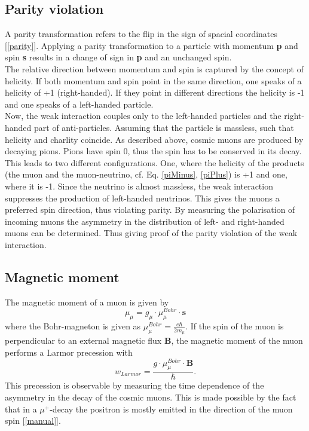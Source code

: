\subsection{Parity violation}
A parity transformation refers to the flip in the sign of spacial coordinates [\ref{parity}]. Applying a parity transformation to a particle with momentum \textbf{p} and spin \textbf{s} results in a change of sign in \textbf{p} and an unchanged spin.\\
The relative direction between momentum and spin is captured by the concept of helicity. If both momentum and spin point in the same direction, one speaks of a helicity of +1 (right-handed). If they point in different directions the helicity is -1 and one speaks of a left-handed particle.\\
Now, the weak interaction couples only to the left-handed particles and the right-handed part of anti-particles. Assuming that the particle is massless, such that helicity and charlity coincide. As described above, cosmic muons are produced by decaying pions. Pions have spin 0, thus the spin has to be conserved in its decay. This leads to two different configurations. One, where the helicity of the products (the muon and the muon-neutrino, cf. Eq. \ref{piMinus}, \ref{piPlus}) is +1 and one, where it is -1. Since the neutrino is almost massless, the weak interaction suppresses the production of left-handed neutrinos. This gives the muons a preferred spin direction, thus violating parity. By measuring the polarisation of incoming muons the asymmetry in the distribution of left- and right-handed muons can be determined. Thus giving proof of the parity violation of the weak interaction.\\

\subsection{Magnetic moment}
The magnetic moment of a muon is given by
\begin{equation}
\mu_{\mu} = g_\mu \cdot \mu_\mu^{Bohr} \cdot \mathbf{s}
\end{equation}
where the Bohr-magneton is given as $\mu_\mu^{Bohr} = \frac{e \hbar}{2 m_\mu}$. If the spin of the muon is perpendicular to an external magnetic flux \textbf{B}, the magnetic moment of the muon performs a Larmor precession with
\begin{equation}
w_{Larmor} = \frac{g \cdot \mu_\mu^{Bohr} \cdot \mathbf{B}}{\hbar}.
\end{equation}
This precession is observable by measuring the time dependence of the asymmetry in the decay of the cosmic muons. This is made possible by the fact that in a $\mu^+$-decay the positron is mostly emitted in the direction of the muon spin [\ref{manual}]. 


